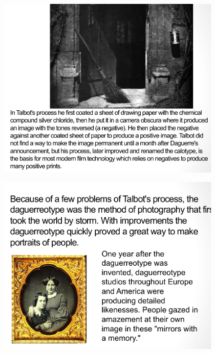 \documentclass{beamer}
\begin{document}
\begin{frame}
	\begin{figure}
		\centering
		\includegraphics[scale=0.4]{81.jpg}
	\end{figure}
\end{frame}

\begin{frame}
	\begin{figure}
		\centering
		\includegraphics[scale=0.4]{82.jpg}
	\end{figure}
\end{frame}
\end{document}
